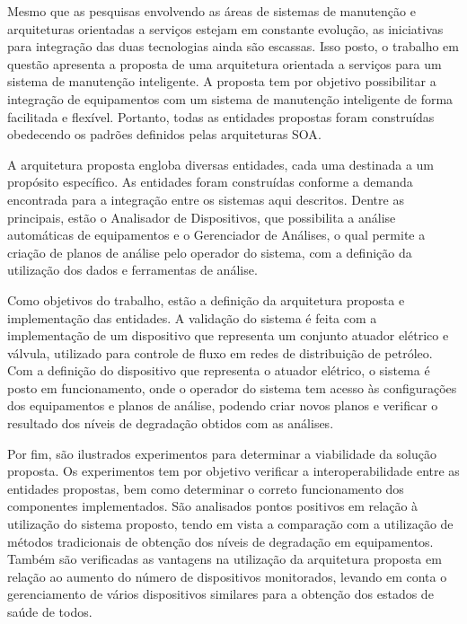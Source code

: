
Mesmo que as pesquisas envolvendo as áreas de sistemas de manutenção e arquiteturas orientadas a
serviços estejam em constante evolução, as iniciativas para integração das duas tecnologias ainda
são escassas. Isso posto, o trabalho em questão apresenta a proposta de uma arquitetura orientada a
serviços para um sistema de manutenção inteligente. A proposta tem por objetivo possibilitar a
integração de equipamentos com um sistema de manutenção inteligente de forma facilitada e flexível.
Portanto, todas as entidades propostas foram construídas obedecendo os padrões definidos pelas
arquiteturas \gls{SOA}.

A arquitetura proposta engloba diversas entidades, cada uma destinada a um propósito específico. As
entidades foram construídas conforme a demanda encontrada para a integração entre os sistemas aqui
descritos. Dentre as principais, estão o Analisador de Dispositivos, que possibilita a análise
automáticas de equipamentos e o Gerenciador de Análises, o qual permite a criação de planos de
análise pelo operador do sistema, com a definição da utilização dos dados e ferramentas de análise.



Como objetivos do trabalho, estão a definição da arquitetura proposta e implementação das entidades.
A validação do sistema é feita com a implementação de um dispositivo que representa um conjunto
atuador elétrico e válvula, utilizado para controle de fluxo em redes de distribuição de petróleo.
Com a definição do dispositivo que representa o atuador elétrico, o sistema é posto em
funcionamento, onde o operador do sistema tem acesso às configurações dos equipamentos e planos de
análise, podendo criar novos planos e verificar o resultado dos níveis de degradação obtidos com as
análises.

Por fim, são ilustrados experimentos para determinar a viabilidade da solução proposta. Os
experimentos tem por objetivo verificar a interoperabilidade entre as entidades propostas, bem como
determinar o correto funcionamento dos componentes implementados. São analisados pontos positivos em
relação à utilização do sistema proposto, tendo em vista a comparação com a utilização de métodos
tradicionais de obtenção dos níveis de degradação em equipamentos. Também são verificadas as
vantagens na utilização da arquitetura proposta em relação ao aumento do número de dispositivos
monitorados, levando em conta o gerenciamento de vários dispositivos similares para a obtenção dos
estados de saúde de todos.


